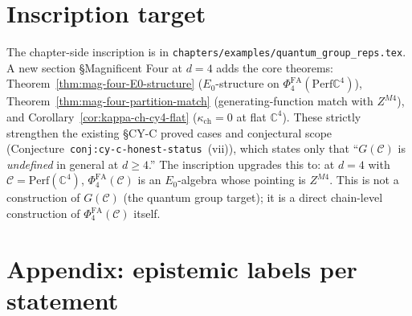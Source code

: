 \documentclass[11pt]{article}
\providecommand{\C}{\mathbb{C}}
\providecommand{\cC}{\mathcal{C}}
\providecommand{\Perf}{\mathrm{Perf}}
\providecommand{\Ezero}{E_0}
\providecommand{\PhiFA}{\Phi^{\mathrm{FA}}}
\theoremstyle{definition}
\begin{document}
\section{Inscription target}
\label{sec:inscribe-target}

The chapter-side inscription is in
\texttt{chapters/examples/quantum\_group\_reps.tex}. A new section
\S Magnificent Four at $d = 4$ adds the core theorems:
Theorem~\ref{thm:mag-four-E0-structure}
($\Ezero$-structure on $\PhiFA_4(\Perf \C^4)$),
Theorem~\ref{thm:mag-four-partition-match}
(generating-function match with $Z^{M4}$), and
Corollary~\ref{cor:kappa-ch-cy4-flat}
($\kappa_{\mathrm{ch}} = 0$ at flat $\C^4$). These strictly strengthen
the existing \S CY-C proved cases and conjectural scope
(Conjecture~\texttt{conj:cy-c-honest-status}~(vii)), which states only
that ``$G(\cC)$ is \emph{undefined} in general at $d \geq 4$.'' The
inscription upgrades this to: at $d = 4$ with $\cC = \Perf(\C^4)$,
$\PhiFA_4(\cC)$ is an $\Ezero$-algebra whose pointing is $Z^{M4}$.
This is not a construction of $G(\cC)$ (the quantum group target);
it is a direct chain-level construction of $\PhiFA_4(\cC)$ itself.

\section{Appendix: epistemic labels per statement}
\label{sec:epistemic-labels}
\end{document}
